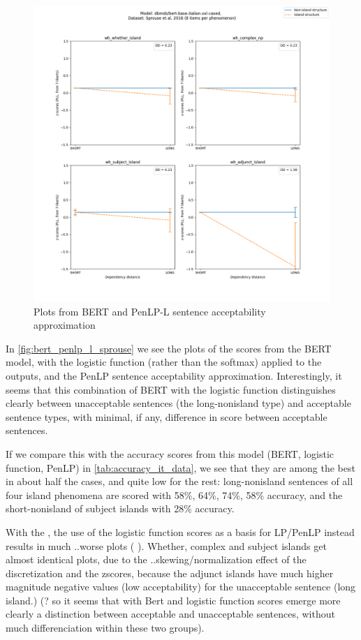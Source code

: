 \begin{figure}
\centering
	\includegraphics[width=1\textwidth]{images/AppendixA/Sprouse_wh_dbmdz_bert-base-italian-xxl-cased_PLL-zscores-likert-2022-07-11.png} 
	\caption{Plots from BERT and PenLP-L sentence acceptability approximation}
	\label{fig:bert_penlp_l_sprouse}
\end{figure}

In \autoref{fig:bert_penlp_l_sprouse} we see the plots of the scores from the BERT model, with the logistic function (rather than the softmax) applied to the outputs, and the PenLP sentence acceptability approximation. Interestingly, it seems that this combination of BERT with the logistic function distinguishes clearly between unacceptable sentences (the long-nonisland type) and acceptable sentence types, with minimal, if any, difference in score between acceptable sentences.

If we compare this with the accuracy scores from this model (BERT, logistic function, PenLP) in \autoref{tab:accuracy_it_data}, we see that they are among the best in about half the cases, and quite low for the rest: long-nonisland sentences of all four island phenomena are scored with 58\%, 64\%, 74\%, 58\% accuracy, and the short-nonisland of subject islands with 28\% accuracy.

With the , the use of the logistic function scores as a basis for LP/PenLP instead results in much ..worse plots (  ). Whether, complex and subject islands get almost identical plots, due to the ..skewing/normalization effect of the discretization and the zscores, because the adjunct islands have much higher magnitude negative values (low acceptability) for the unacceptable sentence (long island.) (? so it seems that with Bert and logistic function scores emerge more clearly a distinction between acceptable and unacceptable sentences, without much differenciation within these two groups).

